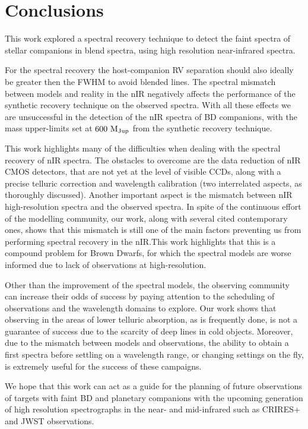 \documentclass[fleqn,usenatbib]{mnras}
\begin{document}
\section{Conclusions}
\label{sec:conclusions}
This work explored a spectral recovery technique to detect the faint spectra of stellar companions in blend spectra, using high resolution near-infrared spectra. 

For the spectral recovery the host-companion RV separation should also ideally be greater then the FWHM to avoid blended lines. The spectral mismatch between models and reality in the nIR negatively affects the performance of the synthetic recovery technique on the observed spectra. With all these effects we are unsuccessful in the detection of the nIR spectra of BD companions,  with the mass upper-limits set at \(\rm 600~M_{Jup}\) from the synthetic recovery technique.

This work highlights many of the difficulties when dealing with the spectral recovery of nIR spectra. The obstacles to overcome are the data reduction of nIR CMOS detectors, that are not yet at the level of visible CCDs, along with a precise telluric correction and wavelength calibration (two interrelated aspects, as thoroughly discussed). Another important aspect is the mismatch between nIR high-resolution spectra and the observed spectra. In spite of the continuous effort of the modelling community, our work, along with several cited contemporary ones, shows that this mismatch is still one of the main factors preventing us from performing spectral recovery in the nIR.\@ This work highlights that this is a compound problem for Brown Dwarfs, for which the spectral models are worse informed due to lack of observations at high-resolution.

Other than the improvement of the spectral models, the observing community can increase their odds of success by paying attention to the scheduling of observations and the wavelength domains to explore. Our work shows that observing in the areas of lower telluric absorption, as is frequently done, is not a guarantee of success due to the scarcity of deep lines in cold objects. Moreover, due to the mismatch between models and observations, the ability to obtain a first spectra before settling on a wavelength range, or changing settings on the fly, is extremely useful for the success of these campaigns.

We hope that this work can act as a guide for the planning of future observations of targets with faint BD and planetary companions with the upcoming generation of high resolution spectrographs in the near- and mid-infrared such as CRIRES+ and JWST observations.
\end{document}
